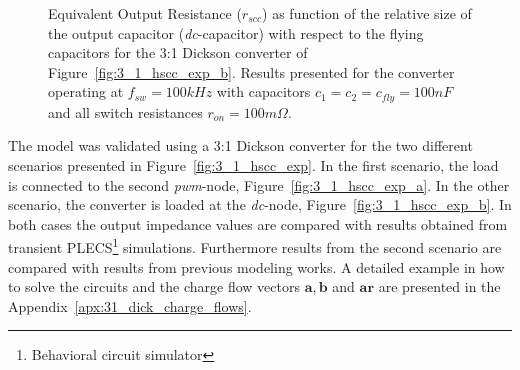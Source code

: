 \begin{figure}[!h]
\newcommand\pHeigh{5cm}
\newcommand\pWidth{7cm}
\centering
     
     \caption{Equivalent Output Resistance ($r_{scc}$) as function of the relative size of the output capacitor (\emph{dc}-capacitor) with respect to the flying capacitors for the 3:1 Dickson converter of Figure~\ref{fig:3_1_hscc_exp_b}. Results presented for the converter operating at $f_{sw}=100kHz$ with capacitors $c_1=c_2=c_{fly}=100nF$ and all switch resistances $r_{on} = 100m\Omega$.}\label{fig:exp_rscc_pwm_node_fsw}
\end{figure}



The model was validated using a 3:1 Dickson converter for the two different scenarios presented in Figure~\ref{fig:3_1_hscc_exp}. In the first scenario, the load is connected to the second \emph{pwm}-node, Figure~\ref{fig:3_1_hscc_exp_a}. In the other scenario, the converter is loaded at the \emph{dc}-node, Figure~\ref{fig:3_1_hscc_exp_b}. In both cases the output impedance values are compared with results obtained from transient PLECS\footnote{\label{fn:PLECS}Behavioral circuit simulator} simulations. Furthermore results from the second scenario are compared with results from previous modeling works.  A detailed example in how to solve the circuits and the charge flow vectors $\mathbf{a}, \mathbf{b} $ and $\mathbf{ar}$ are presented in the Appendix~\ref{apx:31_dick_charge_flows}.


%

